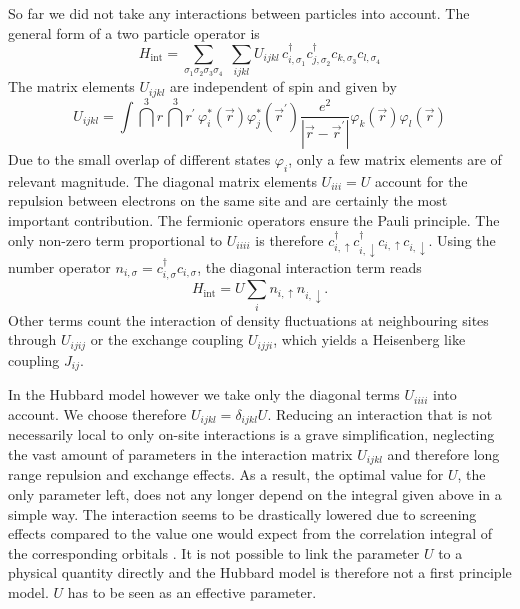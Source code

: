 \documentclass[a4paper,12pt]{report}
\begin{document}
So far we did not take any interactions between particles into account.
The general form of a two particle operator is
\begin{equation}
 H_{\text{int}} = \sum_{\sigma_1 \sigma_2 \sigma_3 \sigma_4} \; \sum_{ijkl} U_{ijkl} \, c^{\dagger}_{i,\sigma_1} c^{\dagger}_{j,\sigma_2} c_{k,\sigma_3} c_{l,\sigma_4}
\end{equation}
%
The matrix elements $U_{ijkl}$ are independent of spin and given by
\begin{equation}
 U_{ijkl} = \int \!  \dint^3 r  \, \dint^3 r^{\prime} \,  \varphi_i^*(\vec{r}) \varphi_j^*(\vec{r}^{\prime}) \frac{e^2}{|\vec{r}-\vec{r}^{\prime} |} \varphi_k(\vec{r}) \varphi_l(\vec{r}) 
\end{equation}
Due to the small overlap of different states $\varphi_i$, only a few matrix elements are of relevant magnitude.
The diagonal matrix elements $U_{iii} = U$ account for the repulsion between electrons on the same site and are certainly the most important contribution.
The fermionic operators ensure the Pauli principle. 
The only non-zero term proportional to $U_{iiii}$ is therefore $c^{\dagger}_{i,\uparrow} c^{\dagger}_{i,\downarrow} c_{i,\uparrow} c_{i,\downarrow}$. 
Using the number operator $n_{i,\sigma} = c^{\dagger}_{i,\sigma} c_{i,\sigma}$, the diagonal interaction term reads
\begin{equation}
 H_{\text{int}} = U \sum_i n_{i,\uparrow} n_{i,\downarrow}.
\end{equation}
Other terms count the interaction of density fluctuations at neighbouring sites through $U_{ijij}$ 
or
the exchange coupling $U_{ijji}$, which yields a Heisenberg like coupling $J_{ij}$.

In the Hubbard model however we take only the diagonal terms $U_{iiii}$ into account.
We choose therefore $U_{ijkl} = \delta_{ijkl} U$. 
Reducing an interaction that is not necessarily local to only on-site interactions is a grave simplification, 
neglecting the vast amount of parameters in the interaction matrix $U_{ijkl}$ and therefore long range repulsion and exchange effects.
As a result, the optimal value for $U$, the only parameter left, does not any longer depend on the integral given above in a simple way.
The interaction seems to be drastically lowered due to screening effects compared to the value one would expect from the correlation integral of the corresponding orbitals
\cite{J.Phys.Cond.Matter.Vol21.34}.
It is not possible to link the parameter $U$ to a physical quantity directly
and the Hubbard model is therefore not a first principle model. 
$U$ has to be seen as an effective parameter.
\end{document}

